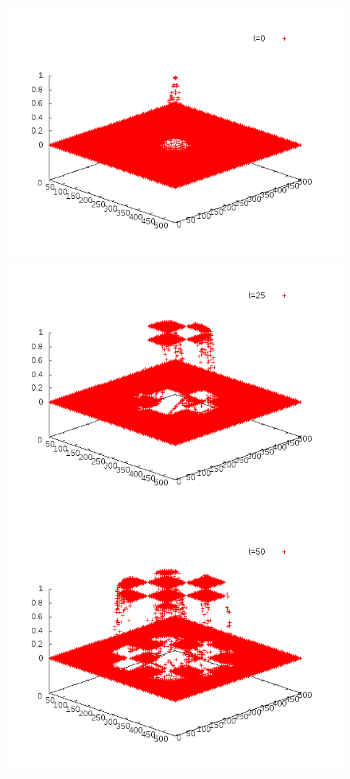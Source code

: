 \documentclass{article}
\begin{document}
\begin{figure}[!h]
\centering
	\includegraphics[scale=0.25]{img/anim2-80-1.png}
	\includegraphics[scale=0.25]{img/anim2-80-50.png}\\
	\includegraphics[scale=0.25]{img/anim2-80-100.png}

\end{figure}
\end{document}
